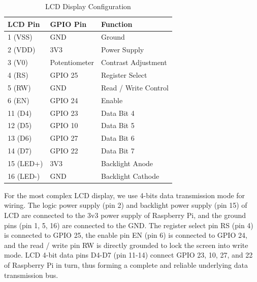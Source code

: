 \vspace{-1em}

\begin{table}[H]
    \centering
    \caption{LCD Display Configuration}
    \label{tab:lcd_config}
    \begin{tabularx}{0.75\columnwidth}{@{}l l X@{}}
        \toprule
        \textbf{LCD Pin} & \textbf{GPIO Pin} & \textbf{Function} \\
        \midrule
        1  (VSS)    & GND           & Ground                \\
        2  (VDD)    & 3V3           & Power Supply          \\
        3  (V0)     & Potentiometer & Contrast Adjustment   \\
        4  (RS)     & GPIO 25       & Register Select       \\
        5  (RW)     & GND           & Read / Write Control  \\
        6  (EN)     & GPIO 24       & Enable                \\
        11 (D4)     & GPIO 23       & Data Bit 4            \\
        12 (D5)     & GPIO 10       & Data Bit 5            \\
        13 (D6)     & GPIO 27       & Data Bit 6            \\
        14 (D7)     & GPIO 22       & Data Bit 7            \\
        15 (LED+)   & 3V3           & Backlight Anode       \\
        16 (LED-)   & GND           & Backlight Cathode     \\ 
        \bottomrule
    \end{tabularx}
\end{table}

\vspace{-1em}

For the most complex LCD display, we use 4-bits data transmission mode for wiring. The logic power supply (pin 2) and backlight power supply (pin 15) of LCD are connected to the 3v3 power supply of Raspberry Pi, and the ground pins (pin 1, 5, 16) are connected to the GND. The register select pin RS (pin 4) is connected to GPIO 25, the enable pin EN (pin 6) is connected to GPIO 24, and the read / write pin RW is directly grounded to lock the screen into write mode. LCD 4-bit data pins D4-D7 (pin 11-14) connect GPIO 23, 10, 27, and 22 of Raspberry Pi in turn, thus forming a complete and reliable underlying data transmission bus.
